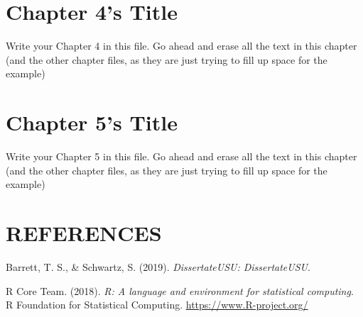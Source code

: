 \documentclass{DissertateUSU}
\begin{document}
\chapter{Chapter 4's Title}

\doublespacing

Write your Chapter 4 in this file. Go ahead and erase all the text in
this chapter (and the other chapter files, as they are just trying to
fill up space for the example)

\lipsum

\FloatBarrier
\newpage
\fancyhead[R]{\thepage} \fancyfoot[C]{}

\chapter{Chapter 5's Title}

\doublespacing

Write your Chapter 5 in this file. Go ahead and erase all the text in
this chapter (and the other chapter files, as they are just trying to
fill up space for the example)

\lipsum

\FloatBarrier
\newpage
\fancyhead[R]{\thepage} \fancyfoot[C]{}

\chapter*{REFERENCES}

\setlength{\parindent}{-0.5in} \setlength{\leftskip}{0.4in}
\setlength{\parskip}{6pt} \noindent

\hypertarget{refs}{}
\hypertarget{ref-dissertateUSU}{}
Barrett, T. S., \& Schwartz, S. (2019). \emph{DissertateUSU:
DissertateUSU}.

\hypertarget{ref-RCoreTeam}{}
R Core Team. (2018). \emph{R: A language and environment for statistical
computing}. R Foundation for Statistical Computing.
\url{https://www.R-project.org/}


\end{document}
